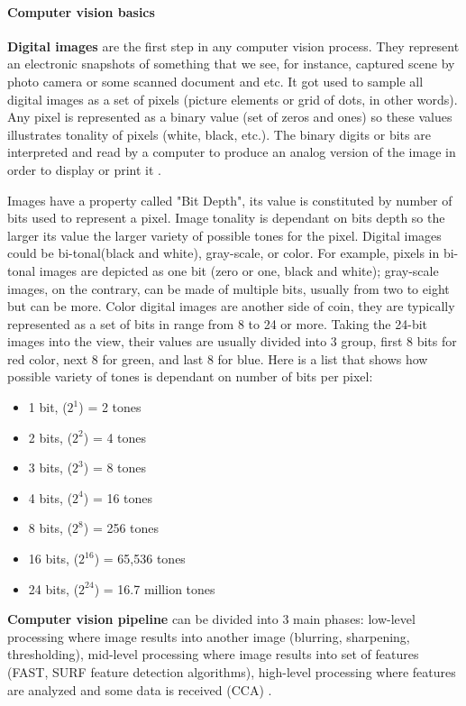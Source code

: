 \documentclass[../../../../main]{subfiles}
\begin{document}
\paragraph{Computer vision basics}

\textbf{Digital images} are the first step in any computer vision process. They represent an electronic snapshots of something that we see, for instance, captured scene by photo camera or some scanned document and etc. It got used to sample all digital images as a set of pixels (picture elements or grid of dots, in other words). Any pixel is represented as a binary value (set of zeros and ones) so these values illustrates tonality of pixels (white, black, etc.). The binary digits or bits are interpreted and read by a computer to produce an analog version of the image in order to display or print it \cite{digital_images}.

Images have a property called "Bit Depth", its value is constituted by number of bits used to represent a pixel. Image tonality is dependant on bits depth so the larger its value the larger variety of possible tones for the pixel. Digital images could be bi-tonal(black and white), gray-scale, or color. For example, pixels in bi-tonal images are depicted as one bit (zero or one, black and white); gray-scale images, on the contrary, can be made of multiple bits, usually from two to eight but can be more. Color digital images are another side of coin, they are typically represented as a set of bits in range from 8 to 24 or more. Taking the 24-bit images into the view, their values are usually divided into 3 group, first 8 bits for red color, next 8 for green, and last 8 for blue.
Here is a list that shows how possible variety of tones is dependant on number of bits per pixel:

\begin{itemize}
    \item 1 bit, ($2^1$) = 2 tones
    \item 2 bits, ($2^2$) = 4 tones
    \item 3 bits, ($2^3$) = 8 tones
    \item 4 bits, ($2^4$) = 16 tones
    \item 8 bits, ($2^8$) = 256 tones
    \item 16 bits, ($2^{16}$) = 65,536 tones
    \item 24 bits, ($2^{24}$) = 16.7 million tones
\end{itemize}

\textbf{Computer vision pipeline} can be divided into 3 main phases: low-level processing where image results into another image (blurring, sharpening, thresholding), mid-level processing where image results into set of features (\ac{FAST}, \ac{SURF} feature detection algorithms), high-level processing where features are analyzed and some data is received (\ac{CCA}) \cite{cv_basics_linda_shapiro}. 
\end{document}
